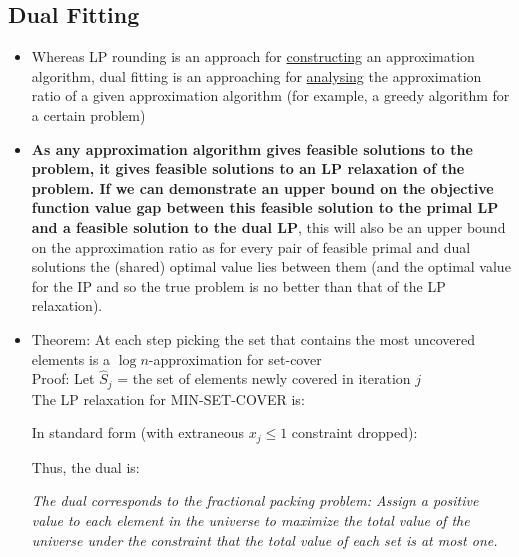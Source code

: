 \documentclass[20pt,a4paper,landscape]{extarticle}
\begin{document}
\begin{flushleft}
\subsection{Dual Fitting}
\begin{itemize}
\item Whereas LP rounding is an approach for \underline{constructing} an approximation algorithm, dual fitting is an approaching for \underline{analysing} the approximation ratio of a given approximation algorithm (for example, a greedy algorithm for a certain problem)
\item \textbf{As any approximation algorithm gives feasible solutions to the problem, it gives feasible solutions to an LP relaxation of the problem. If we can demonstrate an upper bound on the objective function value gap between this feasible solution to the primal LP and a feasible solution to the dual LP}, this will also be an upper bound on the approximation ratio as for every pair of feasible primal and dual solutions the (shared) optimal value lies between them (and the optimal value for the IP and so the true problem is no better than that of the LP relaxation).
\clearpage
\item Theorem: At each step picking the set that contains the most uncovered elements is a $\log n$-approximation for set-cover\\
Proof: Let $\hat{S}_j$ = the set of elements newly covered in iteration $j$\\
The LP relaxation for MIN-SET-COVER is:
\begin{lpformulation}
\end{lpformulation}
\clearpage
In standard form (with extraneous $x_j \leq 1$ constraint dropped):
\begin{lpformulation}
\end{lpformulation}
Thus, the dual is:
\begin{lpformulation}
\end{lpformulation}
\textit{The dual corresponds to the fractional packing problem: Assign a positive value to each element in the universe to maximize the total value of the universe under the constraint that the total value of each set is at most one.}\\

\end{itemize}
\end{flushleft}
\end{document}
